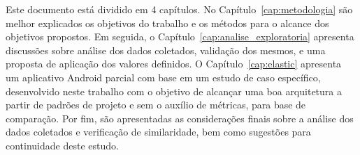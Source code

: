 Este documento está dividido em 4 capítulos. No Capítulo~\ref{cap:metodologia} são melhor explicados os objetivos do trabalho e os métodos para o alcance dos objetivos propostos. Em seguida, o Capítulo~\ref{cap:analise_exploratoria} apresenta discussões sobre análise dos dados coletados, validação dos mesmos, e uma proposta de aplicação dos valores definidos. O Capítulo~\ref{cap:elastic} apresenta um aplicativo Android parcial com base em um estudo de caso específico, desenvolvido neste trabalho com o objetivo de alcançar uma boa arquitetura a partir de padrões de projeto e sem o auxílio de métricas, para base de comparação. Por fim, são apresentadas as considerações finais sobre a análise dos dados coletados e verificação de similaridade, bem como sugestões para continuidade deste estudo.
